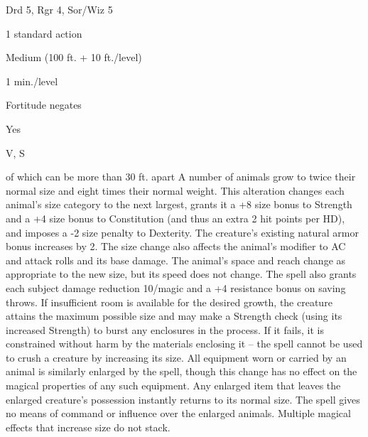 
\begin{description*}
\item[Level:] Drd 5, Rgr 4, Sor/Wiz 5
\item[Casting Time:] 1 standard action
\item[Range:] Medium (100 ft. + 10 ft./level)
\item[Duration:] 1 min./level
\item[Saving Throw:] Fortitude negates
\item[Spell Resistance:] Yes
\item[Components:] V, S
\end{description*}

of which can be more than 30 ft. apart
A number of animals grow to twice their normal size and eight times their normal
weight. This alteration changes each animal's size category to the next largest,
grants it a +8 size bonus to Strength and a +4 size bonus to Constitution (and
thus an extra 2 hit points per HD), and imposes a -2 size penalty to Dexterity.
The creature's existing natural armor bonus increases by 2. The size change also
affects the animal's modifier to AC and attack rolls and its base damage. The animal's
space and reach change as appropriate to the new size, but its speed does not change.
The spell also grants each subject damage reduction 10/magic and a +4 resistance
bonus on saving throws. If insufficient room is available for the desired growth,
the creature attains the maximum possible size and may make a Strength check (using
its increased Strength) to burst any enclosures in the process. If it fails, it
is constrained without harm by the materials enclosing it --  the spell cannot be
used to crush a creature by increasing its size.
All equipment worn or carried by an animal is similarly enlarged by the spell,
though this change has no effect on the magical properties of any such equipment.
Any enlarged item that leaves the enlarged creature's possession instantly returns
to its normal size.
The spell gives no means of command or influence over the enlarged animals.
Multiple magical effects that increase size do not stack.